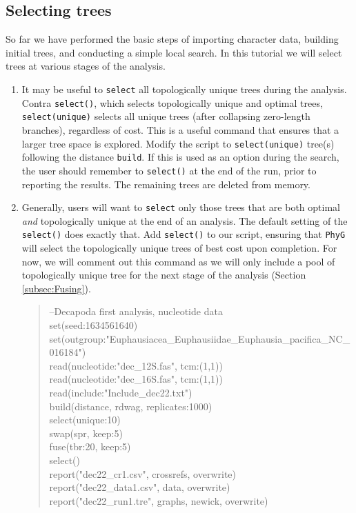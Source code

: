\documentclass[11pt]{article}
\newcommand{\phyg}{\texttt{PhyG} }
\begin{document}
\subsection{Selecting trees}
\label{subsec:Selecting}

So far we have performed the basic steps of importing character data, building 
initial trees, and conducting a simple local search. In this tutorial we will select 
trees at various stages of the analysis. 

\begin{enumerate}

\item It may be useful to \texttt{select} all topologically unique trees during the 
analysis. Contra \texttt{select()}, which selects topologically unique and optimal 
trees, \texttt{select(unique)} selects all unique trees (after collapsing zero-length 
branches), regardless of cost. This is a useful command that ensures that a 
larger tree space is explored. Modify the script to \texttt{select(unique)} tree(s) 
following the distance \texttt{build}. If this is used as an option during the 
search, the user should remember to \texttt{select()} at the end of the run, 
prior to reporting the results. The remaining trees are deleted from memory.

\item Generally, users will want to \texttt{select} only those trees that are both 
optimal \emph{and} topologically unique at the end of an analysis. The default 
setting of the \texttt{select()} does exactly that. Add \texttt{select()} to our script, 
ensuring that \phyg will select the topologically unique trees of best cost upon 
completion. For now, we will comment out this command as we will only include 
a pool of topologically unique tree for the next stage of the analysis (Section 
\ref{subsec:Fusing}).

	\begin{quote}	
	--Decapoda first analysis, nucleotide data\\
	set(seed:1634561640)\\
	set(outgroup:"Euphausiacea\_Euphausiidae\_Euphausia\_pacifica\_NC\_016184")\\
	read(nucleotide:"dec\_12S.fas", tcm:(1,1))\\
	read(nucleotide:"dec\_16S.fas", tcm:(1,1))\\
	read(include:"Include\_dec22.txt")\\
	build(distance, rdwag, replicates:1000)\\
	select(unique:10)\\
	swap(spr, keep:5)\\
	fuse(tbr:20, keep:5)\\
	select()\\
	report("dec22\_cr1.csv", crossrefs, overwrite)\\
	report("dec22\_data1.csv", data, overwrite)\\
	report("dec22\_run1.tre", graphs, newick, overwrite)
	\end{quote}

\end{enumerate}
\end{document}
